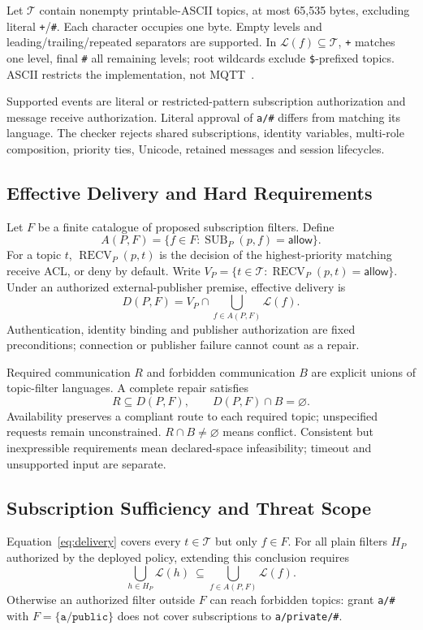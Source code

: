 \documentclass[letterpaper,journal]{IEEEtran}
\newcommand{\T}{\mathcal T}
\newcommand{\Lang}{\mathcal L}
\begin{document}
Let $\T$ contain nonempty printable-ASCII topics, at most 65,535 bytes, excluding literal \texttt{+}/\texttt{\#}. Each character occupies one byte. Empty levels and leading/trailing/repeated separators are supported. In $\Lang(f)\subseteq\T$, \texttt{+} matches one level, final \texttt{\#} all remaining levels; root wildcards exclude \texttt{\$}-prefixed topics. ASCII restricts the implementation, not MQTT~\cite{mqtt311}.

Supported events are literal or restricted-pattern subscription authorization and message receive authorization. Literal approval of \texttt{a/\#} differs from matching its language. The checker rejects shared subscriptions, identity variables, multi-role composition, priority ties, Unicode, retained messages and session lifecycles.

\subsection{Effective Delivery and Hard Requirements}
Let $F$ be a finite catalogue of proposed subscription filters. Define
\begin{equation}
 A(P,F)=\{f\in F:\operatorname{SUB}_P(p,f)=\mathsf{allow}\}.
\end{equation}
For a topic $t$, $\operatorname{RECV}_P(p,t)$ is the decision of the highest-priority matching receive ACL, or deny by default. Write $V_P=\{t\in\T:\operatorname{RECV}_P(p,t)=\mathsf{allow}\}$. Under an authorized external-publisher premise, effective delivery is
\begin{equation}\label{eq:delivery}
 D(P,F)=V_P\cap\bigcup_{f\in A(P,F)}\Lang(f).
\end{equation}
Authentication, identity binding and publisher authorization are fixed preconditions; connection or publisher failure cannot count as a repair.

Required communication $R$ and forbidden communication $B$ are explicit unions of topic-filter languages. A complete repair satisfies
\begin{equation}\label{eq:req}
 R\subseteq D(P,F),\qquad D(P,F)\cap B=\varnothing.
\end{equation}
Availability preserves a compliant route to each required topic; unspecified requests remain unconstrained. $R\cap B\ne\varnothing$ means conflict. Consistent but inexpressible requirements mean declared-space infeasibility; timeout and unsupported input are separate.

\subsection{Subscription Sufficiency and Threat Scope}
Equation~\eqref{eq:delivery} covers every $t\in\T$ but only $f\in F$. For all plain filters $H_P$ authorized by the deployed policy, extending this conclusion requires
\begin{equation}\label{eq:closure}
 \bigcup_{h\in H_P}\Lang(h)\ \subseteq
 \bigcup_{f\in A(P,F)}\Lang(f).
\end{equation}
Otherwise an authorized filter outside $F$ can reach forbidden topics: grant \texttt{a/\#} with $F=\{\texttt{a/public}\}$ does not cover subscriptions to \texttt{a/private/\#}.
\end{document}
